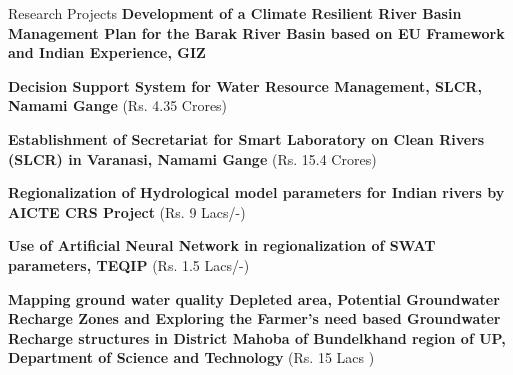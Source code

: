 \begin{rubric}{Research Projects}
\entry*{}
    \textbf{Development of a Climate Resilient River Basin Management Plan for the Barak River Basin based on EU Framework and Indian Experience, GIZ} 
    
\entry*{}
    \textbf{Decision Support System for Water Resource Management, SLCR, Namami Gange} (Rs. 4.35 Crores)
    
\entry*{}
    \textbf{Establishment of Secretariat for Smart Laboratory on Clean Rivers (SLCR) in Varanasi, Namami Gange} (Rs. 15.4 Crores)
    
\entry*{}
    \textbf{Regionalization of Hydrological model parameters for Indian rivers by AICTE CRS Project} (Rs. 9 Lacs/-)
    
\entry*{}
    \textbf{Use of Artificial Neural Network in regionalization of SWAT parameters, TEQIP} (Rs. 1.5 Lacs/-)
    
\entry*{}
    \textbf{Mapping ground water quality Depleted area, Potential Groundwater Recharge Zones and Exploring the Farmer’s need based Groundwater Recharge structures in District Mahoba of Bundelkhand region of UP, Department of Science and Technology} (Rs. 15 Lacs )
    
\end{rubric}
